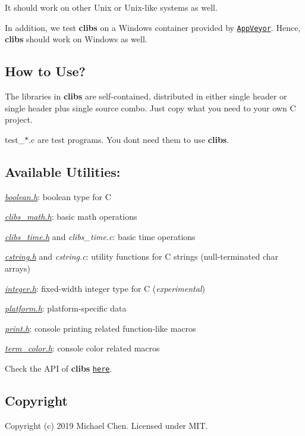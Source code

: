 It should work on other Unix or Unix-\/like systems as well.

In addition, we test {\bfseries clibs} on a Windows container provided by \href{https://www.appveyor.com/}{\tt App\+Veyor}. Hence, {\bfseries clibs} should work on Windows as well.

\subsection*{How to Use?}

The libraries in {\bfseries clibs} are self-\/contained, distributed in either single header or single header plus single source combo. Just copy what you need to your own C project.

test\+\_\+$\ast$.c are test programs. You don\textquotesingle{}t need them to use {\bfseries clibs}.

\subsection*{Available Utilities\+:}


\begin{DoxyItemize}
\item {\itshape \hyperlink{boolean_8h}{boolean.\+h}}\+: boolean type for C
\item {\itshape \hyperlink{clibs__math_8h}{clibs\+\_\+math.\+h}}\+: basic math operations
\item {\itshape \hyperlink{clibs__time_8h}{clibs\+\_\+time.\+h}} and {\itshape clibs\+\_\+time.\+c}\+: basic time operations
\item {\itshape \hyperlink{cstring_8h}{cstring.\+h}} and {\itshape cstring.\+c}\+: utility functions for C strings (null-\/terminated {\ttfamily char} arrays)
\item {\itshape \hyperlink{integer_8h}{integer.\+h}}\+: fixed-\/width integer type for C ({\itshape experimental})
\item {\itshape \hyperlink{platform_8h}{platform.\+h}}\+: platform-\/specific data
\item {\itshape \hyperlink{print_8h}{print.\+h}}\+: console printing related function-\/like macros
\item {\itshape \hyperlink{term__color_8h}{term\+\_\+color.\+h}}\+: console color related macros
\end{DoxyItemize}

Check the A\+PI of {\bfseries clibs} \href{https://cwchentw.github.io/clibs/html/index.html}{\tt here}.

\subsection*{Copyright}

Copyright (c) 2019 Michael Chen. Licensed under M\+IT. 